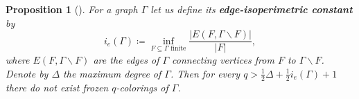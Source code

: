 \documentclass[letterpaper,10pt]{article}
\theoremstyle{plain}
\newtheorem{proposition}[theorem]{Proposition}
\begin{document}
\begin{proposition}[\cite{alon2019mixing}]\label{prop:nofroz_graph} For a graph $\Gamma$ let us define its \textbf{edge-isoperimetric constant} by
	$$
	i_e(\Gamma)\coloneqq \inf_{F\subseteq \Gamma \text{ finite}}\frac{|E(F,\Gamma\backslash F)|}{|F|},
	$$
	where $E(F,\Gamma\backslash F)$ are the edges of $\Gamma$ connecting vertices from $F$ to $\Gamma\backslash F$. Denote by $\Delta$ the maximum degree of $\Gamma$. Then for every $q>\frac{1}{2}\Delta+\frac{1}{2}i_e(\Gamma)+1$ there do not exist frozen $q$-colorings of $\Gamma$.
\end{proposition}
%	
%	
%	
\end{document}
